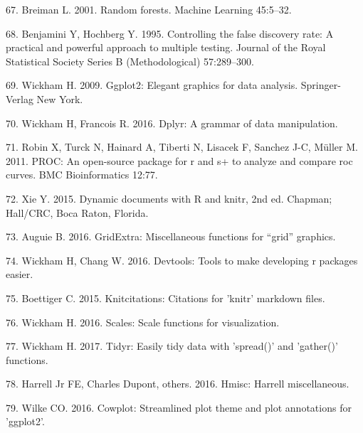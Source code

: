 \documentclass[12pt,]{article}
\begin{document}
\hypertarget{ref-breiman_rf_2001}{}
67. Breiman L. 2001. Random forests. Machine Learning 45:5--32.

\hypertarget{ref-Benjamini_Hochberg_1995}{}
68. Benjamini Y, Hochberg Y. 1995. Controlling the false discovery rate:
A practical and powerful approach to multiple testing. Journal of the
Royal Statistical Society Series B (Methodological) 57:289--300.

\hypertarget{ref-ggplot2}{}
69. Wickham H. 2009. Ggplot2: Elegant graphics for data analysis.
Springer-Verlag New York.

\hypertarget{ref-dplyr}{}
70. Wickham H, Francois R. 2016. Dplyr: A grammar of data manipulation.

\hypertarget{ref-pROC}{}
71. Robin X, Turck N, Hainard A, Tiberti N, Lisacek F, Sanchez J-C,
Müller M. 2011. PROC: An open-source package for r and s+ to analyze and
compare roc curves. BMC Bioinformatics 12:77.

\hypertarget{ref-knitr2015}{}
72. Xie Y. 2015. Dynamic documents with R and knitr, 2nd ed. Chapman;
Hall/CRC, Boca Raton, Florida.

\hypertarget{ref-gridExtra}{}
73. Auguie B. 2016. GridExtra: Miscellaneous functions for ``grid''
graphics.

\hypertarget{ref-devtools}{}
74. Wickham H, Chang W. 2016. Devtools: Tools to make developing r
packages easier.

\hypertarget{ref-knitcitations}{}
75. Boettiger C. 2015. Knitcitations: Citations for 'knitr' markdown
files.

\hypertarget{ref-scales}{}
76. Wickham H. 2016. Scales: Scale functions for visualization.

\hypertarget{ref-tidyr}{}
77. Wickham H. 2017. Tidyr: Easily tidy data with 'spread()' and
'gather()' functions.

\hypertarget{ref-Hmisc}{}
78. Harrell Jr FE, Charles Dupont, others. 2016. Hmisc: Harrell
miscellaneous.

\hypertarget{ref-cowplot}{}
79. Wilke CO. 2016. Cowplot: Streamlined plot theme and plot annotations
for 'ggplot2'.
\end{document}
